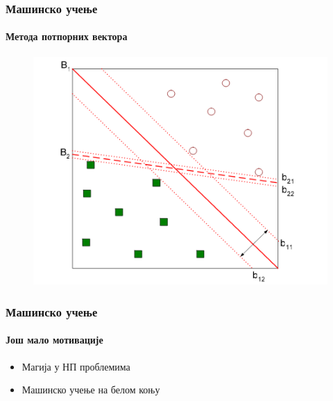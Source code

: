 \documentclass{beamer}
\begin{document}
\begin{frame}
\frametitle{Машинско учење}
\framesubtitle{Метода потпорних вектора}
\begin{figure}
\centering
\includegraphics[scale=0.4]{slike/svm.png}
\end{figure}
\end{frame}
\begin{frame}
\frametitle{Машинско учење}
\framesubtitle{Још мало мотивације}
\begin{itemize}
 	\item Магија у НП проблемима
 	\item Машинско учење на белом коњу
\end{itemize}
\end{frame}
\end{document}
